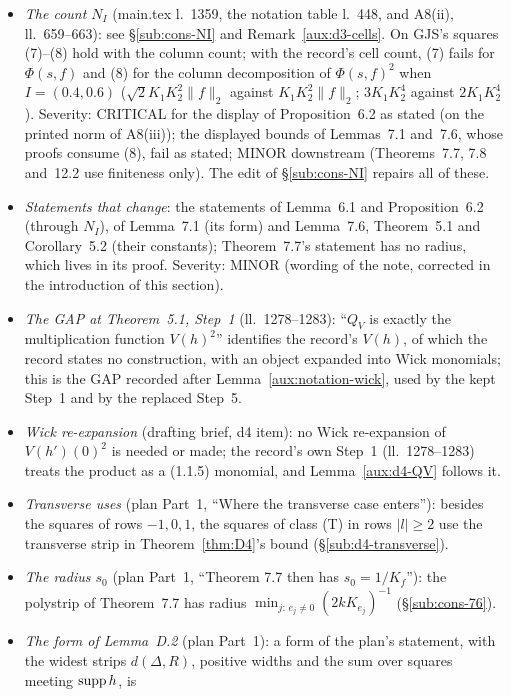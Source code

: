\begin{itemize}
\item \emph{The count $N_I$} (main.tex l.~1359, the notation table l.~448, and A8(ii),
ll.~659--663): see \S\ref{sub:cons-NI} and Remark~\ref{aux:d3-cells}.  On GJS's squares (7)--(8)
hold with the column count; with the record's cell count, (7) fails for $\Phi(s,f)$ and (8) for
the column decomposition of $\Phi(s,f)^2$ when $I=(0.4,0.6)$ ($\sqrt2K_1K_2^2\|f\|_2$ against
$K_1K_2^2\|f\|_2$; $3K_1K_2^4$ against $2K_1K_2^4$).  Severity: CRITICAL for the display of
Proposition~6.2 as stated (on the printed norm of A8(iii)); the displayed bounds of Lemmas~7.1
and~7.6, whose proofs consume (8), fail as stated; MINOR downstream (Theorems~7.7, 7.8 and~12.2
use finiteness only).  The edit of \S\ref{sub:cons-NI} repairs all of these.
\item \emph{Statements that change}: the statements of Lemma~6.1 and Proposition~6.2 (through
$N_I$), of Lemma~7.1 (its form) and Lemma~7.6, Theorem~5.1 and Corollary~5.2 (their constants);
Theorem~7.7's statement has no radius, which lives in its proof.  Severity: MINOR (wording of the
note, corrected in the introduction of this section).
\item \emph{The GAP at Theorem~5.1, Step~1} (ll.~1278--1283): ``$Q_V$ is exactly the multiplication
function $V(h)^2$'' identifies the record's $V(h)$, of which the record states no construction,
with an object expanded into Wick monomials; this is the GAP recorded after
Lemma~\ref{aux:notation-wick}, used by the kept Step~1 and by the replaced Step~5.
\item \emph{Wick re-expansion} (drafting brief, d4 item): no Wick re-expansion of $V(h')(0)^2$ is
needed or made; the record's own Step~1 (ll.~1278--1283) treats the product as a (1.1.5) monomial,
and Lemma~\ref{aux:d4-QV} follows it.
\item \emph{Transverse uses} (plan Part~1, ``Where the transverse case enters''): besides the
squares of rows $-1,0,1$, the squares of class (T) in rows $|l|\ge2$ use the transverse strip in
Theorem~\ref{thm:D4}'s bound (\S\ref{sub:d4-transverse}).
\item \emph{The radius $s_0$} (plan Part~1, ``Theorem 7.7 then has $s_0=1/K_f$''): the polystrip
of Theorem~7.7 has radius $\min_{j:\,e_j\ne0}(2kK_{e_j})^{-1}$ (\S\ref{sub:cons-76}).
\item \emph{The form of Lemma~D.2} (plan Part~1): a form of the plan's statement, with the widest
strips $d(\Delta,R)$, positive widths and the sum over squares meeting $\operatorname{supp} h$, is

\end{itemize}
